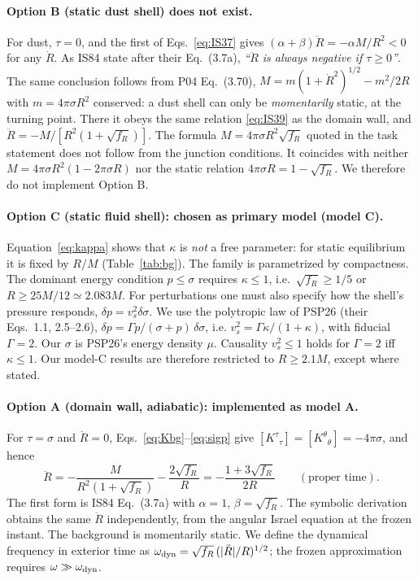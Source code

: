 \documentclass[11pt,a4paper]{article}
\numberwithin{equation}{section}
\newcommand{\sq}{\sqrt{f_R}}
\begin{document}
\paragraph{Option B (static dust shell) does not exist.}
For dust, $\tau=0$, and the first of Eqs.~\eqref{eq:IS37} gives $(\alpha+\beta)\ddot R=-\alpha M/R^2<0$ for
any $\dot R$. As IS84 state after their Eq.~(3.7a), \emph{``$\ddot R$ is always negative if $\tau\ge0$''}. The
same conclusion follows from P04 Eq.~(3.70), $M=m(1+\dot R^2)^{1/2}-m^2/2R$ with $m=4\pi\sigma R^2$
conserved: a dust shell can only be \emph{momentarily} static, at the turning point. There it obeys the same
relation \eqref{eq:IS39} as the domain wall, and $\ddot R=-M/[R^2(1+\sq)]$. The formula
$M=4\pi\sigma R^2\sq$ quoted in the task statement does not follow from the junction conditions. It coincides
with neither $M=4\pi\sigma R^2(1-2\pi\sigma R)$ nor the static relation $4\pi\sigma R=1-\sq$. We therefore
do not implement Option B.

\paragraph{Option C (static fluid shell): chosen as primary model (model C).}
Equation~\eqref{eq:kappa} shows that $\kappa$ is \emph{not} a free parameter: for static equilibrium it is
fixed by $R/M$ (Table~\ref{tab:bg}). The family is parametrized by compactness. The dominant energy condition
$p\le\sigma$ requires $\kappa\le1$, i.e.\ $\sq\ge1/5$ or $R\ge25M/12\simeq2.083M$. For perturbations one must
also specify how the shell's pressure responds, $\delta p=v_s^2\delta\sigma$. We use the polytropic law of
PSP26 (their Eqs.~1.1, 2.5--2.6), $\delta p=\Gamma p/(\sigma+p)\,\delta\sigma$, i.e.
$v_s^2=\Gamma\kappa/(1+\kappa)$, with fiducial $\Gamma=2$. Our $\sigma$ is PSP26's energy density $\mu$.
Causality $v_s^2\le1$ holds for $\Gamma=2$ iff $\kappa\le1$. Our model-C results are therefore restricted to
$R\ge2.1M$, except where stated.

\paragraph{Option A (domain wall, adiabatic): implemented as model A.}
For $\tau=\sigma$ and $\dot R=0$, Eqs.~\eqref{eq:Kbg}--\eqref{eq:sigp} give $[K^\tau{}_\tau]=[K^\theta{}_\theta]=-4\pi\sigma$,
and hence
\begin{equation}
\ddot R=-\frac{M}{R^2(1+\sq)}-\frac{2\sq}{R}=-\frac{1+3\sq}{2R}\qquad(\text{proper time}).
\label{eq:Rdd}
\end{equation}
The first form is IS84 Eq.~(3.7a) with $\alpha=1$, $\beta=\sq$. The symbolic derivation obtains the same
$\ddot R$ independently, from the angular Israel equation at the frozen instant. The background is
momentarily static. We define the dynamical frequency in exterior time as
$\omega_{\rm dyn}=\sq\,(|\ddot R|/R)^{1/2}$; the frozen approximation requires $\omega\gg\omega_{\rm dyn}$.
\end{document}
